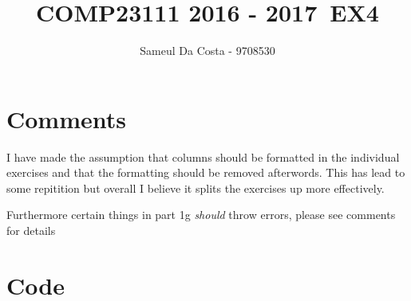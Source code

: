 \documentclass{article}
\title{COMP23111 2016 - 2017\ EX4}
\author{Sameul Da Costa - 9708530}
\begin{document}
\maketitle

\section{Comments}
I have made the assumption that columns should be formatted in the individual
exercises and that the formatting should be removed afterwords. This has lead to some repitition
but overall I believe it splits the exercises up more effectively.

Furthermore certain things in part 1g \emph{should} throw errors, please see comments for details
\section{Code}
\end{document}
